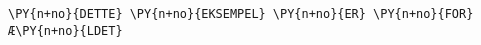 \begin{Verbatim}[commandchars=\\\{\}]
\PY{n+no}{DETTE} \PY{n+no}{EKSEMPEL} \PY{n+no}{ER} \PY{n+no}{FOR}Æ\PY{n+no}{LDET}
\end{Verbatim}
